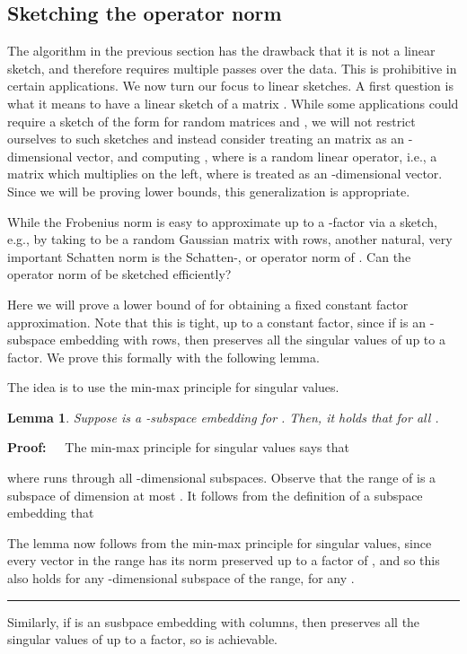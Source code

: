 \documentclass[11pt]{article}
\newtheorem{lemma}[theorem]{Lemma}
\newenvironment{proof}{\begin{trivlist} \item {\bf Proof:~~}}
  {\qed\end{trivlist}}
\def\qed{\hfill\rule{2mm}{2mm}}
\begin{document}
\subsection{Sketching the operator norm}\label{sec:oded}
The algorithm in the previous section 
has the drawback that it is not a linear sketch, and therefore requires multiple passes
over the data. This is prohibitive in certain applications. We now turn our focus to linear sketches. A first
question is what it means to have a linear sketch of a matrix . While some applications could require
a sketch of the form  for random matrices  and , we will not restrict ourselves
to such sketches and instead consider treating an  matrix  as an -dimensional vector, 
and computing , where  is a random linear operator, i.e.,
a  matrix which multiplies  on the left, where  is treated as an -dimensional vector.
Since we will be proving lower bounds, this generalization is appropriate. 

While the Frobenius norm is easy to approximate up to a -factor 
via a sketch, e.g., by taking  to be a random Gaussian matrix with
 rows, another natural, very important Schatten norm is the Schatten-, or operator norm
of . Can the operator norm of  be sketched efficiently?

Here we will prove a lower bound of  for obtaining a fixed constant factor approximation.
Note that this is tight, up to a constant factor, since if  is an -subspace embedding with 
rows, then  preserves all the singular values of  up to a  factor. We prove this formally 
with the following lemma.

The idea is to use the min-max principle for singular values. 
	\begin{lemma}\label{lem:interlace}
Suppose  is a  -subspace embedding for .  
Then, 
it holds that  for all .
	\end{lemma}
\begin{proof}
The min-max principle for singular values says that

where  runs through all -dimensional subspaces. 
Observe that the range of  is a subspace of dimension at most . It follows from the definition of a subspace embedding that 

The lemma now follows from the min-max principle for singular values, since every vector in the range
has its norm preserved up to a factor of , and so this also holds for any -dimensional subspace
of the range, for any . 
\end{proof}
Similarly, if 
is an  susbpace embedding with  columns, then  preserves all the singular values of 
up to a  factor, so  is achievable. 
\end{document}
